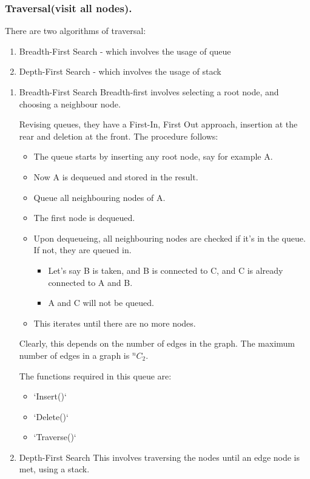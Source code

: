 \documentclass[11pt]{article}
\begin{document}
\subsubsection{Traversal(visit all nodes).}
\label{sec:org8f89ce2}
There are two algorithms of traversal:
\begin{enumerate}
\item Breadth-First Search - which involves the usage of queue
\item Depth-First Search - which involves the usage of stack
\end{enumerate}
\begin{enumerate}
\item Breadth-First Search
\label{sec:org006f6af}
Breadth-first involves selecting a root node, and choosing a neighbour node.

Revising queues, they have a First-In, First Out approach, insertion at the rear and deletion at the front.
The procedure follows:
\begin{itemize}
\item The queue starts by inserting any root node, say for example A.
\item Now A is dequeued and stored in the result.
\item Queue all neighbouring nodes of A.
\item The first node is dequeued.
\item Upon dequeueing, all neighbouring nodes are checked if it's in the queue. If not, they are queued in.
\begin{itemize}
\item Let's say B is taken, and B is connected to C, and C is already connected to A and B.
\item A and C will not be queued.
\end{itemize}
\item This iterates until there are no more nodes.
\end{itemize}

Clearly, this depends on the number of edges in the graph. The maximum number of edges in a graph is \(^nC_2\).

The functions required in this queue are:
\begin{itemize}
\item `Insert()`
\item `Delete()`
\item `Traverse()`
\end{itemize}
\item Depth-First Search
\label{sec:org59af29e}
This involves traversing the nodes until an edge node is met, using a stack.


\end{enumerate}
\end{document}
